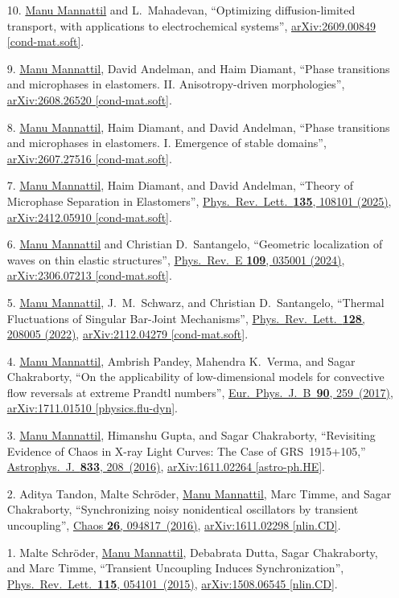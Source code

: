\documentclass[10pt,article,oneside]{memoir}
\def\bname{\underline{Manu Mannattil}}    %
\def\doi#1#2{\href{https://doi.org/#1}{#2}}
\def\arxiv#1#2{\href{https://arxiv.org/abs/#1}{arXiv:#1 [#2]}}
\begin{document}
\begin{enumerate}
  \item[10.] {\bname} and L.~Mahadevan,
    ``Optimizing diffusion-limited transport, with applications to electrochemical systems'',
    \arxiv{2609.00849}{cond-mat.soft}.

  \item[9.] {\bname}, David Andelman, and Haim Diamant,
    ``Phase transitions and microphases in elastomers. II. Anisotropy-driven morphologies'',
    \arxiv{2608.26520}{cond-mat.soft}.

  \item[8.] {\bname}, Haim Diamant, and David Andelman,
    ``Phase transitions and microphases in elastomers. I. Emergence of stable domains'',
    \arxiv{2607.27516}{cond-mat.soft}.

  \item[7.]
    \bname, Haim Diamant, and David Andelman,
    ``Theory of Microphase Separation in Elastomers'',
    \doi{10.1103/5q7m-3fpn}{Phys.~Rev.~Lett.~\textbf{135}, 108101 (2025)},
    \arxiv{2412.05910}{cond-mat.soft}.

  \item[6.]
    {\bname} and Christian D.~Santangelo,
    ``Geometric localization of waves on thin elastic structures'',
    \doi{10.1103/PhysRevE.109.035001}{Phys.~Rev.~E \textbf{109}, 035001 (2024)},
    \arxiv{2306.07213}{cond-mat.soft}.

  \item[5.]
    \bname, J.~M.~Schwarz, and Christian D.~Santangelo,
    ``Thermal Fluctuations of Singular Bar-Joint Mechanisms'',
    \doi{10.1103/PhysRevLett.128.208005}{Phys.~Rev.~Lett.~\textbf{128}, 208005 (2022)},
    \arxiv{2112.04279}{cond-mat.soft}.

  \item[4.]
    \bname, Ambrish Pandey, Mahendra K.~Verma, and Sagar Chakraborty,
    ``On the applicability of low-dimensional models for convective flow reversals at extreme Prandtl numbers'',
    \doi{10.1140/epjb/e2017-80391-1}{Eur.~Phys.~J.~B~\textbf{90}, 259~(2017)},
    \arxiv{1711.01510}{physics.flu-dyn}.

  \item[3.]
    \bname, Himanshu Gupta, and Sagar Chakraborty,
    ``Revisiting Evidence of Chaos in X-ray Light Curves: The Case of GRS~1915+105,''
    \doi{10.3847/1538-4357/833/2/208}{Astrophys.~J.~\textbf{833}, 208~(2016)},
    \arxiv{1611.02264}{astro-ph.HE}.

  \item[2.]
    Aditya Tandon, Malte Schr\"{o}der, \bname, Marc Timme, and Sagar Chakraborty,
    ``Synchronizing noisy nonidentical oscillators by transient uncoupling'',
    \doi{10.1063/1.4959141}{Chaos \textbf{26}, 094817~(2016)},
    \arxiv{1611.02298}{nlin.CD}.

  \item[1.]
    Malte Schr\"{o}der, \bname, Debabrata Dutta, Sagar Chakraborty, and Marc Timme,
    ``Transient Uncoupling Induces Synchronization'',
    \doi{10.1103/PhysRevLett.115.054101}{Phys.~Rev.~Lett.~\textbf{115}, 054101~(2015)},
    \arxiv{1508.06545}{nlin.CD}.
\end{enumerate}
\end{document}
